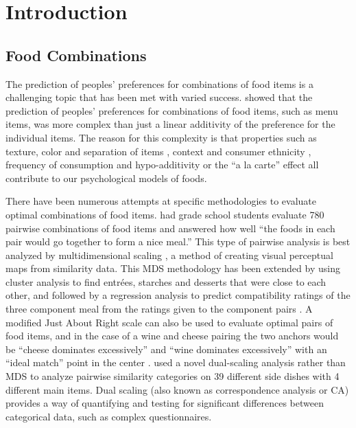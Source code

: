 \chapter{Introduction}

\section{Food Combinations}
The prediction of peoples’ preferences for combinations of food items is a challenging topic that has been met with varied success.  \citet{Eindhoven1959} showed that the prediction of peoples’ preferences for combinations of food items, such as menu items, was more complex than just a linear additivity of the preference for the individual items.  The reason for this complexity is that properties such as texture, color and separation of items \citep{Eindhoven1959,Pilgrim1961}, context and consumer ethnicity \citep*{Marshall2003,Niewind1986}, frequency of consumption \citep{Marshall2003} and hypo-additivity or the “a la carte” effect \citep{Lawless1994} all contribute to our psychological models of foods.

There have been numerous attempts at specific methodologies to evaluate optimal combinations of food items.  \citet{Worsley1984} had grade school students evaluate 780 pairwise combinations of food items and answered how well “the foods in each pair would go together to form a nice meal.” This type of pairwise analysis is best analyzed by multidimensional scaling \citep{Schiffman1981}, a method of creating visual perceptual maps from similarity data. This MDS methodology has been extended by using cluster analysis to find entrées, starches and desserts that were close to each other, and followed by a regression analysis to predict compatibility ratings of the three component meal from the ratings given to the component pairs \citep{Klarman1977}.  A modified Just About Right scale \citep{Johnson1987} can also be used to evaluate optimal pairs of food items, and in the case of a wine and cheese pairing the two anchors would be “cheese dominates excessively” and “wine dominates excessively” with an “ideal match” point in the center \citep{King2005}.  \citeauthor{Niewind1986} \citep{Niewind1986} used a novel dual-scaling analysis \citep{Nishisato1984} rather than MDS to analyze pairwise similarity categories on 39 different side dishes with 4 different main items.  Dual scaling (also known as correspondence analysis or CA) provides a way of quantifying and testing for significant differences between categorical data, such as complex questionnaires.

